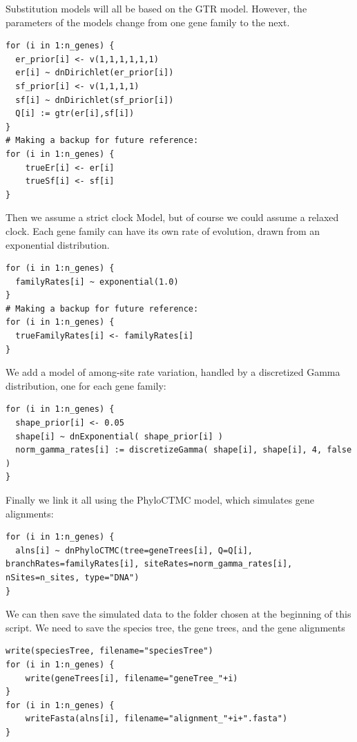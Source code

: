 \documentclass[11pt]{article}
\begin{document}
{\begin{framed}
Substitution models will all be based on the GTR model. However, the parameters of the models change from one gene family to the next.
 {\tt \begin{snugshade*}
\begin{lstlisting}
for (i in 1:n_genes) {
  er_prior[i] <- v(1,1,1,1,1,1)
  er[i] ~ dnDirichlet(er_prior[i])
  sf_prior[i] <- v(1,1,1,1)
  sf[i] ~ dnDirichlet(sf_prior[i])
  Q[i] := gtr(er[i],sf[i]) 
}
# Making a backup for future reference:
for (i in 1:n_genes) {
	trueEr[i] <- er[i]
	trueSf[i] <- sf[i]
}
\end{lstlisting}
\end{snugshade*}}

Then we assume a strict clock Model, but of course we could assume a relaxed clock.
Each gene family can have its own rate of evolution, drawn from an exponential distribution.
 {\tt \begin{snugshade*}
\begin{lstlisting}
for (i in 1:n_genes) {
  familyRates[i] ~ exponential(1.0)
}
# Making a backup for future reference:
for (i in 1:n_genes) {
  trueFamilyRates[i] <- familyRates[i] 
}
\end{lstlisting}
\end{snugshade*}}

We add a model of among-site rate variation, handled by a discretized Gamma distribution, one for each gene family:

 {\tt \begin{snugshade*}
\begin{lstlisting}
for (i in 1:n_genes) {
  shape_prior[i] <- 0.05 
  shape[i] ~ dnExponential( shape_prior[i] )
  norm_gamma_rates[i] := discretizeGamma( shape[i], shape[i], 4, false )
}
\end{lstlisting}
\end{snugshade*}}

Finally we link it all using the PhyloCTMC model, which simulates gene alignments:

 {\tt \begin{snugshade*}
\begin{lstlisting}
for (i in 1:n_genes) {
  alns[i] ~ dnPhyloCTMC(tree=geneTrees[i], Q=Q[i],  branchRates=familyRates[i], siteRates=norm_gamma_rates[i], nSites=n_sites, type="DNA")
}
\end{lstlisting}
\end{snugshade*}}
We can then save the simulated data to the folder chosen at the beginning of this script.
We need to save the species tree, the gene trees, and the gene alignments

 {\tt \begin{snugshade*}
\begin{lstlisting}
write(speciesTree, filename="speciesTree")
for (i in 1:n_genes) {
	write(geneTrees[i], filename="geneTree_"+i)
}
for (i in 1:n_genes) {
	writeFasta(alns[i], filename="alignment_"+i+".fasta")
}
\end{lstlisting}
\end{snugshade*}}
\end{framed}}
\end{document}
